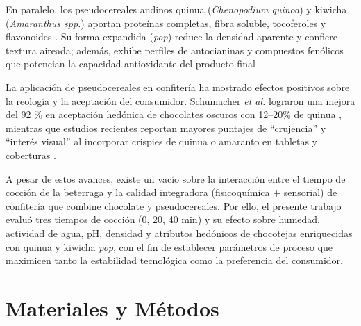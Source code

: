 \documentclass[manuscript,screen,review]{acmart}
\begin{document}
En paralelo, los pseudocereales andinos quinua (\textit{Chenopodium quinoa}) y kiwicha (\textit{Amaranthus spp.}) aportan proteínas completas, fibra soluble, tocoferoles y flavonoides \citep{RepoCarrascoValencia2009}%
  . Su forma expandida (\textit{pop}) reduce la densidad aparente y confiere textura aireada; además, exhibe perfiles de antocianinas y compuestos fenólicos que potencian la capacidad antioxidante del producto final \citep{Pasko2009}%
  .

La aplicación de pseudocereales en confitería ha mostrado efectos positivos sobre la reología y la aceptación del consumidor.  Schumacher \textit{et al.} lograron una mejora del 92 \% en aceptación hedónica de chocolates oscuros con 12–20\% de quinua \citep{Schumacher2010}, mientras que estudios recientes reportan mayores puntajes de “crujencia” y “interés visual” al incorporar crispies de quinua o amaranto en tabletas y coberturas \citep{Gomes2022}%
.

A pesar de estos avances, existe un vacío sobre la interacción entre el tiempo de cocción de la beterraga y la calidad integradora (fisicoquímica + sensorial) de confitería que combine chocolate y pseudocereales.  Por ello, el presente trabajo evaluó tres tiempos de cocción (0, 20, 40 min) y su efecto sobre humedad, actividad de agua, pH, densidad y atributos hedónicos de chocotejas enriquecidas con quinua y kiwicha \textit{pop}, con el fin de establecer parámetros de proceso que maximicen tanto la estabilidad tecnológica como la preferencia del consumidor.

\section{Materiales y Métodos}
\end{document}
